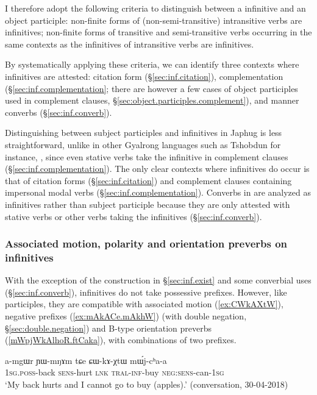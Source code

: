 I therefore adopt the following criteria to distinguish between a  infinitive and an object participle:   non-finite forms of (non-semi-transitive) intransitive verbs are infinitives;  non-finite forms of transitive and semi-transitive verbs occurring in the same contexts as the infinitives of intransitive verbs are infinitives.

By systematically applying these criteria, we can identify three contexts where infinitives are attested: citation form (§\ref{sec:inf.citation}), complementation (§\ref{sec:inf.complementation}; there are however a few cases of object participles used in complement clauses, §\ref{sec:object.participles.complement}), and manner converbs (§\ref{sec:inf.converb}). 

Distinguishing between subject participles and  infinitives in Japhug is less straightforward, unlike in other Gyalrong languages such as Tshobdun for instance, \citealt{jackson14morpho}, since even stative verbs take the  infinitive in complement clauses (§\ref{sec:inf.complementation}). The only clear contexts where  infinitives do occur is that of citation forms (§\ref{sec:inf.citation}) and complement clauses containing impersonal modal verbs (§\ref{sec:inf.complementation}). Converbs in  are analyzed as infinitives rather than subject participle because they are only attested with stative verbs or other verbs taking the  infinitives (§\ref{sec:inf.converb}).

\subsubsection{Associated motion, polarity and orientation preverbs on infinitives}  \label{sec:infinitives.other.prefixes}
With the exception of the construction in §\ref{sec:inf.exist} and some converbial uses (§\ref{sec:inf.converb}),  infinitives do not take possessive prefixes. However, like participles, they are compatible with associated motion (\ref{ex:CWkAXtW}), negative prefixes (\ref{ex:mAkACe.mAkhW}) (with double negation, §\ref{sec:double.negation}) and B-type orientation preverbs (\ref{mWpjWkAlhoR.ftCaka}), with combinations of two prefixes.

\begin{exe}
\ex \label{ex:CWkAXtW}
\gll a-mgɯr ɲɯ-mŋɤm tɕe ɕɯ-kɤ-χtɯ mɯ́j-cʰa-a \\
\textsc{1sg}.\textsc{poss}-back \textsc{sens}-hurt \textsc{lnk} \textsc{tral}-\textsc{inf}-buy \textsc{neg}:\textsc{sens}-can-\textsc{1sg} \\
\glt `My back hurts and I cannot go to  buy (apples).' (conversation, 30-04-2018)
\end{exe}
 
